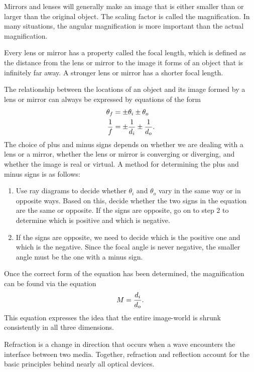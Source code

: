 Mirrors and lenses will generally make an image that is
either smaller than or larger than the original object. The
scaling factor is called the magnification. In many
situations, the angular magnification is more important than
the actual magnification.

Every lens or mirror has a property called the focal length,
which is defined as the distance from the lens or mirror to
the image it forms of an object that is infinitely far away.
A stronger lens or mirror has a shorter focal length.

The relationship between the locations of an object and its
image formed by a lens or mirror can always be expressed by
equations of the form
\begin{align*}
                        \theta_f &= \pm \theta_i \pm \theta_o \\
        \frac{1}{f} &= \pm\frac{1}{d_i}\pm\frac{1}{d_o}.
\end{align*}
The choice of plus and minus signs depends on whether we are
dealing with a lens or a mirror, whether the lens or mirror
is converging or diverging, and whether the image is real or
virtual. A method for determining the plus and minus
signs is as follows:

\begin{enumerate}

\item Use ray diagrams to decide whether $\theta_i$ and
$\theta_o$ vary in the same way or in opposite ways. Based
on this, decide whether the two signs in the equation are
the same or opposite. If the signs are opposite, go on to
step 2 to determine which is positive and which is negative.

\item If the signs are opposite, we need to decide which is the
positive one and which is the negative. Since the focal
angle is never negative, the smaller angle must be the
one with a minus sign.

\end{enumerate}

Once the correct form of the equation has been determined,
the magnification can be found via the equation
\begin{equation*}
                M    =    \frac{d_i}{d_o}.
\end{equation*}
This equation expresses the idea that the entire image-world is shrunk
consistently in all three dimensions.

Refraction is a change in direction that occurs when a wave
encounters the interface between two media. Together,
refraction and reflection account for the basic principles
behind nearly all optical devices.


